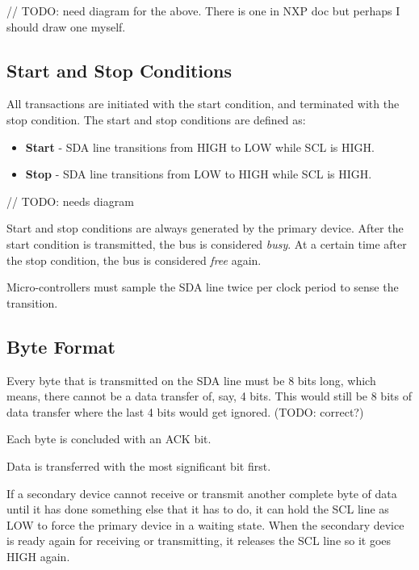 \documentclass[a4paper,12pt,twoside]{report}
\begin{document}
                    // TODO: need diagram for the above. There is one in NXP doc but perhaps I should draw one myself.

                \subsection{Start and Stop Conditions}
                    All transactions are initiated with the start condition, and terminated with the stop condition. The start and stop conditions are defined as:
                    \begin{itemize}
                        \item \textbf{Start} - SDA line transitions from HIGH to LOW while SCL is HIGH.
                        \item \textbf{Stop} - SDA line transitions from LOW to HIGH while SCL is HIGH.
                    \end{itemize}

                    // TODO: needs diagram

                    Start and stop conditions are always generated by the primary device. After the start condition is transmitted, the bus is considered \textit{busy}. At a certain time after the stop condition, the bus is considered \textit{free} again.

                    Micro-controllers must sample the SDA line twice per clock period to sense the transition.

                \subsection{Byte Format}
                    Every byte that is transmitted on the SDA line must be 8 bits long, which means, there cannot be a data transfer of, say, 4 bits. This would still be 8 bits of data transfer where the last 4 bits would get ignored. (TODO: correct?)

                    Each byte is concluded with an ACK bit.

                    Data is transferred with the most significant bit first.

                    If a secondary device cannot receive or transmit another complete byte of data until it has done something else that it has to do, it can hold the SCL line as LOW to force the primary device in a waiting state. When the secondary device is ready again for receiving or transmitting, it releases the SCL line so it goes HIGH again.
\end{document}
